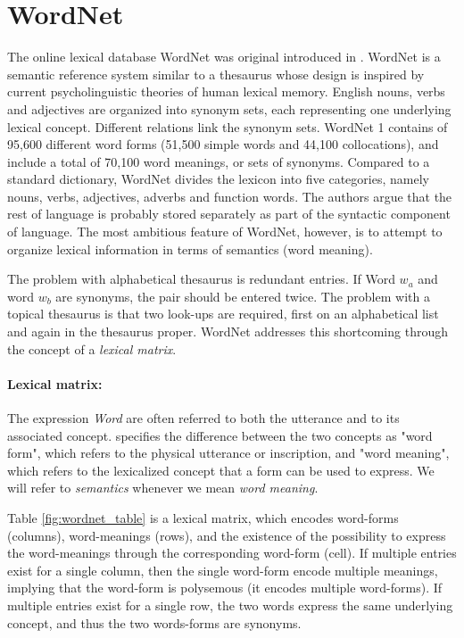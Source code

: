 \documentclass[a4paper,12pt,oneside,openright]{report}
\begin{document}
\section{WordNet}

The online lexical database WordNet was original introduced in \cite{miller90}.
WordNet is a semantic reference system similar to a thesaurus whose design is inspired by current psycholinguistic theories of human lexical memory.
English nouns, verbs and adjectives are organized into synonym sets, each representing one underlying lexical concept.
Different relations link the synonym sets.
WordNet 1 contains of 95,600 different word forms (51,500 simple words and 44,100 collocations), and include a total of 70,100 word meanings, or sets of synonyms.
Compared to a standard dictionary, WordNet divides the lexicon into five categories, namely nouns, verbs, adjectives, adverbs and function words. 
The authors argue that the rest of language is probably stored separately as part of the syntactic component of language.
The most ambitious feature of WordNet, however, is to attempt to organize lexical information in terms of semantics (word meaning).

The problem with alphabetical thesaurus is redundant entries. If Word $w_a$ and word $w_b$ are synonyms, the pair should be entered twice.
The problem with a topical thesaurus is that two look-ups are required, first on an alphabetical list and again in the thesaurus proper.
WordNet addresses this shortcoming through the concept of a \textit{lexical matrix}.

\paragraph{Lexical matrix:} 
The expression \textit{Word} are often referred to both the utterance and to its associated concept.
\cite{miller90} specifies the difference between the two concepts as "word form", which refers to the physical utterance or inscription, and "word meaning", which refers to the lexicalized concept that a form can be used to express.
We will refer to \textit{semantics} whenever we mean \textit{word meaning}.

Table \ref{fig:wordnet_table} is a lexical matrix, which encodes word-forms (columns), word-meanings (rows), and the existence of the possibility to express the word-meanings through the corresponding word-form (cell).
If multiple entries exist for a single column, then the single word-form encode multiple meanings, implying that the word-form is polysemous (it encodes multiple word-forms).
If multiple entries exist for a single row, the two words express the same underlying concept, and thus the two words-forms are synonyms.
\end{document}
